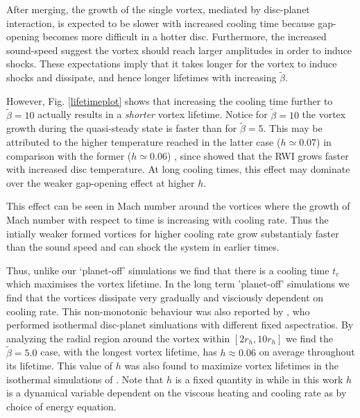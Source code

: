  After merging, the growth of the single vortex, mediated by disc-planet
interaction, is expected to be slower with increased cooling time
because gap-opening becomes more difficult in a hotter
disc. Furthermore, the increased sound-speed suggest the vortex should
reach larger amplitudes in order to induce shocks. 
These expectations
imply that it takes longer for the vortex to induce shocks and
dissipate, and hence longer lifetimes with increasing
$\tilde{\beta}$. 

However, Fig. \ref{lifetimeplot} shows that increasing the cooling
time further to $\tilde{\beta}=10$ actually results in a
\emph{shorter} vortex lifetime. Notice for $\tilde{\beta}=10$ the vortex growth 
during the quasi-steady state is faster than for
$\tilde{\beta}=5$.
 This may be attributed to the higher temperature
reached in the latter case ($h\simeq 0.07$) in comparison with the former
($h\simeq 0.06$)
, since \cite{li00} showed that the RWI grows
faster with increased disc temperature. At long cooling times, this
effect may dominate over the weaker gap-opening effect at higher $h$.   

This effect can be seen in Mach number around the vortices where the
growth of Mach number with respect to time is increasing with cooling rate.
Thus the intially weaker formed vortices for higher cooling rate grow
substantialy faster than the sound speed and can shock the system in earlier
times.

Thus, unlike our `planet-off' simulations we find that there is
a cooling time $t_c$ which maximises the vortex lifetime. In the long term
 'planet-off' simulations we find that the vortices dissipate very gradually
 and visciously dependent on cooling rate.
This
non-monotonic behaviour was also reported by \cite{fu14}, who
performed isothermal disc-planet simluations with different fixed
aspectratios.   
By analyzing the radial region around the vortex within
 $[2r_{h},10r_{h}]$
 we find the
$\tilde\beta=5.0$ case, with the longest vortex lifetime, has
$h\approx0.06$ on average throughout its lifetime. This value of $h$ was also
 found to maximize vortex
lifetimes in the isothermal simulations of \cite{fu14}. Note that $h$ is a fixed
quantity in \cite{fu14} while in this work $h$ is a dynamical variable dependent
 on the viscous heating and cooling rate as by choice of energy equation.

